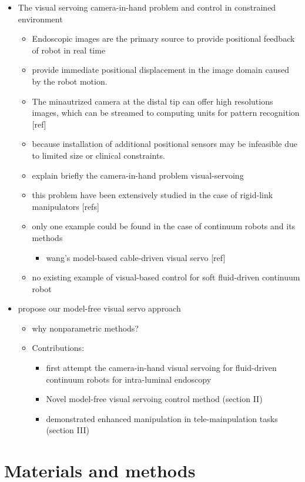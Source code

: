 \documentclass[journal,onecolumn]{IEEEtran}
\begin{document}
\begin{itemize}
\item The visual servoing camera-in-hand problem and control in constrained environment 

\begin{itemize}
\item Endoscopic images are the primary source to provide positional feedback of robot in real time
\item provide immediate positional displacement in the image domain caused by the robot motion.
\item The minautrized camera at the distal tip can offer high resolutions images, which can be streamed to computing units for pattern recognition [ref]
\item because installation of additional positional sensors may be infeasible due to limited size or clinical constraints.
\item explain briefly the camera-in-hand problem visual-servoing
\item this problem have been extensively studied in the case of rigid-link manipulators [refs]
\item only one example could be found in the case of continuum robots and its methods
\begin{itemize}
\item wang's model-based cable-driven visual servo [ref]
\end{itemize}
\item no existing example of visual-based control for soft fluid-driven continuum robot
\end{itemize}

\item propose our model-free visual servo approach
\begin{itemize}
\item why nonparametric methods?
\item Contributions:
\begin{itemize}
\item first attempt the camera-in-hand visual servoing for fluid-driven continuum robots for intra-luminal endoscopy
\item Novel model-free visual servoing control method (section II)
\item demonstrated enhanced manipulation in tele-mainpulation tasks (section III)
\end{itemize}
\end{itemize}
\end{itemize}

\section{Materials and methods}
\label{sec:org93313d6}
\end{document}
